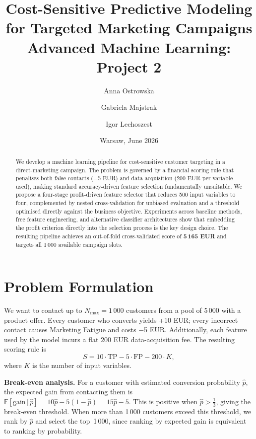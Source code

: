 \documentclass[11pt,a4paper]{article}
\title{%
  \textbf{Cost-Sensitive Predictive Modeling\\for Targeted Marketing Campaigns}\\[0.6em]
  {\large Advanced Machine Learning: Project 2}%
}
\author{Anna Ostrowska \and Gabriela Majstrak \and Igor Lechoszest}
\date{Warsaw, June 2026}
\begin{document}
\maketitle
\thispagestyle{empty}

\begin{abstract}
We develop a machine learning pipeline for cost-sensitive customer targeting in a
direct-marketing campaign. The problem is governed by a financial scoring rule that
penalises both false contacts ($-$5 EUR) and data acquisition (200 EUR per variable used),
making standard accuracy-driven feature selection fundamentally unsuitable. We propose a
four-stage profit-driven feature selector that reduces 500 input variables to four, complemented
by nested cross-validation for unbiased evaluation and a threshold optimised directly against the
business objective. Experiments across baseline methods, free feature engineering, and alternative classifier
architectures show that embedding the profit criterion directly into the selection process
is the key design choice. The resulting pipeline
achieves an out-of-fold cross-validated score of \textbf{5\,165 EUR} and targets all 1\,000
available campaign slots.
\end{abstract}

\section{Problem Formulation}

We want to contact up to $N_{\max} = 1\,000$ customers from a pool of 5\,000 with a
product offer. Every customer who converts yields +10 EUR; every incorrect contact causes
Marketing Fatigue and costs $-$5 EUR. Additionally, each feature used by the model incurs a
flat 200 EUR data-acquisition fee. The resulting scoring rule is
\begin{equation}
    S = 10\cdot\mathrm{TP} - 5\cdot\mathrm{FP} - 200\cdot K,
    \label{eq:score}
\end{equation}
where $K$ is the number of input variables.

\textbf{Break-even analysis.}
For a customer with estimated conversion probability $\hat{p}$, the expected gain from
contacting them is $\mathbb{E}[\text{gain}\,|\,\hat{p}] = 10\hat{p} - 5(1-\hat{p}) = 15\hat{p} - 5$.
This is positive when $\hat{p} > \frac{1}{3}$, giving the break-even threshold.
When more than 1\,000 customers exceed this threshold, we rank by $\hat{p}$ and select the
top~1\,000, since ranking by expected gain is equivalent to ranking by probability.
\end{document}
